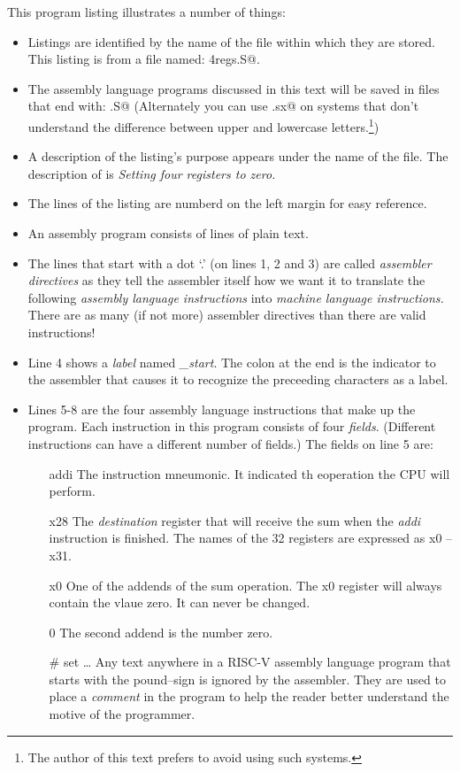 This program listing illustrates a number of things: 
\begin{itemize}
\item Listings are identified by the name of the file within which
	they are stored.  This listing is from a file named: \verb@zero4regs.S@.
\item The assembly language programs discussed in this text will be saved
	in files that end with: \verb@.S@  (Alternately you can use \verb@.sx@ 
	on systems that don't understand the difference between upper and 
	lowercase letters.\footnote{The author of this text prefers to avoid
	using such systems.})
\item A description of the listing's purpose appears under the name of the
	file.  The description of  is 
	{\em Setting four registers to zero.}
\item The lines of the listing are numberd on the left margin for
	easy reference.
\item An assembly program consists of lines of plain text.
\item The lines that start with a dot `.' (on lines 1, 2 and 3) are 
	called {\em assembler directives} as they tell the assembler itself
	how we want it to translate the following {\em assembly language instructions} 
	into {\em machine language instructions.}  There are as many
	(if not more) assembler directives than there are valid
	instructions!
\item Line 4 shows a {\em label} named {\em \_start}.  The colon
	at the end is the indicator to the assembler that causes it to
	recognize the preceeding characters as a label.
\item Lines 5-8 are the four assembly language instructions that
	make up the program.  Each instruction in this program
	consists of four {\em fields}.  (Different instructions can have 
	a different number of fields.)  The fields on line 5 are:

	\begin{itemize}
	\item [addi] The instruction mneumonic.  It indicated th eoperation the 
		CPU will perform.
	\item [x28] The {\em destination} register that will receive the 
		sum when the {\em addi} instruction is finished.  The names of
		the 32 registers are expressed as x0 -- x31.
	\item [x0] One of the addends of the sum operation.  The x0 register
		will always contain the vlaue zero.  It can never be changed.
	\item [0] The second addend is the number zero.
		\item [\# set \ldots] Any text anywhere in a RISC-V assembly language
	program that starts with the pound--sign is ignored by the assembler.
			They are used to place a {\em comment} in the program to help
	the reader better understand the motive of the programmer.
	\end{itemize}


\end{itemize}
